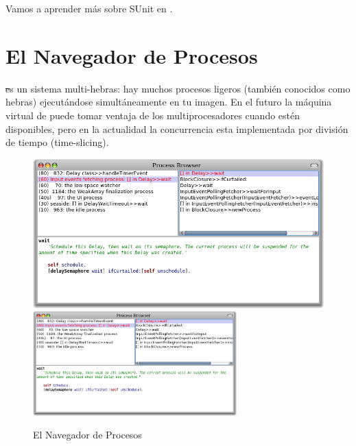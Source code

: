 \documentclass[spanish,a4paper,10pt,twoside]{book}
\begin{document}

Vamos a aprender m\'as sobre SUnit en .


\section{El Navegador de Procesos}

\st es un sistema multi-hebras: hay muchos procesos ligeros (tambi\'en conocidos como hebras) ejecut\'andose simult\'aneamente en tu imagen.
En el futuro la m\'aquina virtual de \pharo puede tomar ventaja de los
multiprocesadores cuando est\'en disponibles, pero en la actualidad la
concurrencia esta implementada por divisi\'on de tiempo (time-slicing).

\begin{figure}[btp]
	\begin{center}
	\ifluluelse
		{\includegraphics[width=\textwidth]{processBrowser}}
		{\includegraphics[width=0.7\textwidth]{processBrowser}}
	\end{center}
	\caption{El Navegador de Procesos}
\end{figure}
\end{document}
